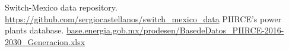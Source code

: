 \documentclass[letterpaper,12pt]{article}
\begin{document}
\begin{thebibliography}{9}
 Switch-Mexico data repository. \url{https://github.com/sergiocastellanos/switch_mexico_data}
PIIRCE's power plants database. \url{base.energia.gob.mx/prodesen/BasedeDatos_PIIRCE-2016-2030_Generacion.xlsx}
\end{thebibliography}
\end{document}
